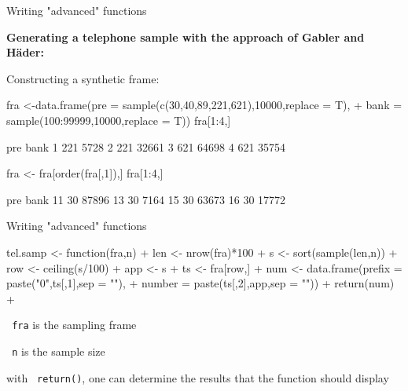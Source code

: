 \documentclass[11pt,german,hideothersubsections]{beamer}
\newcommand{\R}[1]{{\tt \color{blue}  #1}}
\begin{document}
\begin{frame}[fragile]{Writing "advanced" functions}
\footnotesize{
\vspace{-.25cm}
\begin{center}
\textbf{Generating a telephone sample with the approach of Gabler and H\"ader:}
\end{center}
\vspace{.25cm}
Constructing a synthetic frame:
\begin{Schunk}
\begin{Sinput}
 fra <-data.frame(pre = sample(c(30,40,89,221,621),10000,replace = T),
+                  bank = sample(100:99999,10000,replace = T))
 fra[1:4,]
\end{Sinput}
\begin{Soutput}
  pre  bank
1 221  5728
2 221 32661
3 621 64698
4 621 35754
\end{Soutput}
\begin{Sinput}
 fra <- fra[order(fra[,1]),]
 fra[1:4,]
\end{Sinput}
\begin{Soutput}
   pre  bank
11  30 87896
13  30  7164
15  30 63673
16  30 17772
\end{Soutput}
\end{Schunk}
}
\end{frame}
\begin{frame}[fragile]{Writing "advanced" functions}
\footnotesize{
\begin{Schunk}
\begin{Sinput}
 tel.samp <- function(fra,n){
+   len <- nrow(fra)*100
+   s <- sort(sample(len,n))
+   row <- ceiling(s/100)
+   app <- s%
+   ts <- fra[row,]
+   num <- data.frame(prefix = paste("0",ts[,1],sep = ""),
+                     number = paste(ts[,2],app,sep = ""))
+   return(num)
+ }
\end{Sinput}
\end{Schunk}
}

\begin{itemize}\footnotesize{
\item \R{fra} is the sampling frame
\item \R{n} is the sample size
\item with \R{return()}, one can determine the results that the function should display
}
\end{itemize}

\end{frame}
\end{document}
